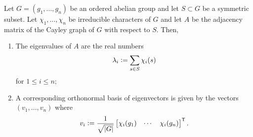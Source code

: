 \documentclass[12pt]{article}	%
\begin{document}
\begin{thm} \label{thm:adjcayleyeigen}
    Let $G = (g_1, \ldots, g_n)$ be an ordered abelian group and let $S \subset G$ be a symmetric subset. Let $\chi_1, \ldots, \chi_n$ be irreducible characters of $G$ and let $A$ be the adjacency matrix of the Cayley graph of $G$ with respect to $S.$ Then,
    \begin{enumerate}
        \item The eigenvalues of $A$ are the real numbers
        \begin{equation*} 
            \lambda_i \vcentcolon= \sum_{s \in S} \chi_i(s)
        \end{equation*}
        for $1 \le i \le n;$
        \item A corresponding orthonormal basis of eigenvectors is given by the vectors $(v_1, \ldots, v_n)$ where
        \begin{equation*} 
            v_i \vcentcolon= \frac{1}{\sqrt{{\left\lvert G \right\lvert}}} \begin{bmatrix}
                \chi_i(g_1) & \cdots & \chi_i(g_n)
            \end{bmatrix}^\mathsf{T}.
        \end{equation*}
    \end{enumerate}
\end{thm}
\end{document}
